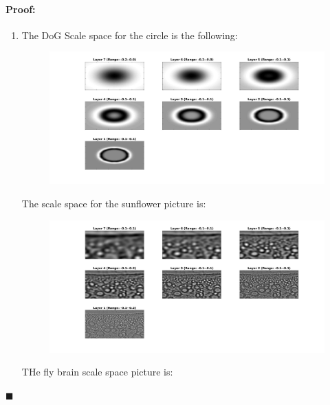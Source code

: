 \documentclass[12pt]{article}
\newenvironment{proof}{\paragraph{Proof: }}{\hfill$\blacksquare$}
\begin{document}
\begin{proof}
\begin{enumerate}
\item The DoG Scale space for the circle is the following:

\begin{figure}[H]
\begin{center}
\advance\leftskip-3cm
\advance\rightskip-3cm
\includegraphics[keepaspectratio=true, scale = 0.2]{circle_scale_space.jpg}
\caption{}
\label{Circle scale space}
\end{center}
\end{figure}

The scale space for the sunflower picture is:

\begin{figure}[H]
\begin{center}
\advance\leftskip-3cm
\advance\rightskip-3cm
\includegraphics[keepaspectratio=true, scale = 0.2]{sunflower_scale_space.jpg}
\caption{}
\label{Sunflower Scale space}
\end{center}
\end{figure}

THe fly brain scale space picture is:


\end{enumerate}
\end{proof}
\end{document}

